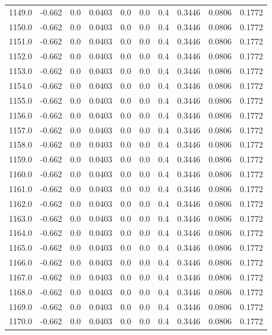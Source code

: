 \begin{longtable}{lrrrrrrrrr}
1149.0 & -0.662 & 0.0 & 0.0403 & 0.0 & 0.0 & 0.4 & 0.3446 & 0.0806 & 0.1772 \\
1150.0 & -0.662 & 0.0 & 0.0403 & 0.0 & 0.0 & 0.4 & 0.3446 & 0.0806 & 0.1772 \\
1151.0 & -0.662 & 0.0 & 0.0403 & 0.0 & 0.0 & 0.4 & 0.3446 & 0.0806 & 0.1772 \\
1152.0 & -0.662 & 0.0 & 0.0403 & 0.0 & 0.0 & 0.4 & 0.3446 & 0.0806 & 0.1772 \\
1153.0 & -0.662 & 0.0 & 0.0403 & 0.0 & 0.0 & 0.4 & 0.3446 & 0.0806 & 0.1772 \\
1154.0 & -0.662 & 0.0 & 0.0403 & 0.0 & 0.0 & 0.4 & 0.3446 & 0.0806 & 0.1772 \\
1155.0 & -0.662 & 0.0 & 0.0403 & 0.0 & 0.0 & 0.4 & 0.3446 & 0.0806 & 0.1772 \\
1156.0 & -0.662 & 0.0 & 0.0403 & 0.0 & 0.0 & 0.4 & 0.3446 & 0.0806 & 0.1772 \\
1157.0 & -0.662 & 0.0 & 0.0403 & 0.0 & 0.0 & 0.4 & 0.3446 & 0.0806 & 0.1772 \\
1158.0 & -0.662 & 0.0 & 0.0403 & 0.0 & 0.0 & 0.4 & 0.3446 & 0.0806 & 0.1772 \\
1159.0 & -0.662 & 0.0 & 0.0403 & 0.0 & 0.0 & 0.4 & 0.3446 & 0.0806 & 0.1772 \\
1160.0 & -0.662 & 0.0 & 0.0403 & 0.0 & 0.0 & 0.4 & 0.3446 & 0.0806 & 0.1772 \\
1161.0 & -0.662 & 0.0 & 0.0403 & 0.0 & 0.0 & 0.4 & 0.3446 & 0.0806 & 0.1772 \\
1162.0 & -0.662 & 0.0 & 0.0403 & 0.0 & 0.0 & 0.4 & 0.3446 & 0.0806 & 0.1772 \\
1163.0 & -0.662 & 0.0 & 0.0403 & 0.0 & 0.0 & 0.4 & 0.3446 & 0.0806 & 0.1772 \\
1164.0 & -0.662 & 0.0 & 0.0403 & 0.0 & 0.0 & 0.4 & 0.3446 & 0.0806 & 0.1772 \\
1165.0 & -0.662 & 0.0 & 0.0403 & 0.0 & 0.0 & 0.4 & 0.3446 & 0.0806 & 0.1772 \\
1166.0 & -0.662 & 0.0 & 0.0403 & 0.0 & 0.0 & 0.4 & 0.3446 & 0.0806 & 0.1772 \\
1167.0 & -0.662 & 0.0 & 0.0403 & 0.0 & 0.0 & 0.4 & 0.3446 & 0.0806 & 0.1772 \\
1168.0 & -0.662 & 0.0 & 0.0403 & 0.0 & 0.0 & 0.4 & 0.3446 & 0.0806 & 0.1772 \\
1169.0 & -0.662 & 0.0 & 0.0403 & 0.0 & 0.0 & 0.4 & 0.3446 & 0.0806 & 0.1772 \\
1170.0 & -0.662 & 0.0 & 0.0403 & 0.0 & 0.0 & 0.4 & 0.3446 & 0.0806 & 0.1772 \\

\end{longtable}
